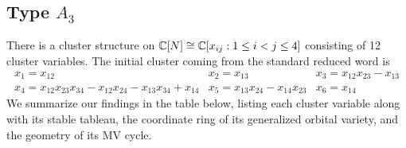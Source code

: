 \documentclass{article}
\begin{document}
\subsection{Type \texorpdfstring{$A_3$}{A3}}\label{ss:GL4 examples}
% 
There is a cluster structure on $\mathbb C[N] \cong \mathbb C[x_{ij} : 1 \leq i < j \leq 4]$ consisting of 12 cluster variables. The initial cluster coming from the standard reduced word is
\[
\begin{array}{ccc}
    x_1 = x_{12} & x_2 = x_{13} & x_3 = x_{12}x_{23}-x_{13} \\
    x_4 = x_{12}x_{23}x_{34} - x_{12}x_{24} - x_{13}x_{34} + x_{14} & x_5 = x_{13}x_{24}-x_{14}x_{23} & x_6 = x_{14} 
\end{array}
\]
We summarize our findings in the table below, listing each cluster variable along with its stable tableau, the coordinate ring of its generalized orbital variety, and the geometry of its MV cycle.  
% 
\end{document}
